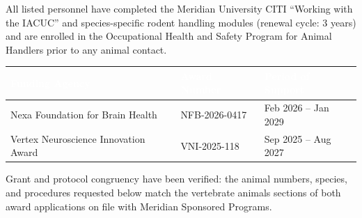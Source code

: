 {\footnotesize\color{ProtocolNavy!70}
All listed personnel have completed the Meridian University CITI ``Working with the IACUC''
and species-specific rodent handling modules (renewal cycle: 3 years) and are enrolled in the
Occupational Health and Safety Program for Animal Handlers prior to any animal contact.\par}

\vspace{8pt}

\noindent
\begin{tabularx}{\linewidth}{@{}
  >{\small}X
  >{\small}p{3.1cm}
  >{\small\centering\arraybackslash}p{3.3cm}
  @{}}
\toprule
\rowcolor{ProtocolNavy}
\textcolor{white}{\textbf{Funding Agency}} &
\textcolor{white}{\textbf{Award Number}} &
\textcolor{white}{\textbf{Period of Support}} \\
\midrule
Nexa Foundation for Brain Health & NFB-2026-0417 & Feb 2026 -- Jan 2029 \\
\rowcolor{LightFog}
Vertex Neuroscience Innovation Award & VNI-2025-118 & Sep 2025 -- Aug 2027 \\
\bottomrule
\end{tabularx}

\vspace{4pt}
{\footnotesize\color{ProtocolNavy!70}
Grant and protocol congruency have been verified: the animal numbers, species, and procedures
requested below match the vertebrate animals sections of both award applications on file with
Meridian Sponsored Programs.\par}

